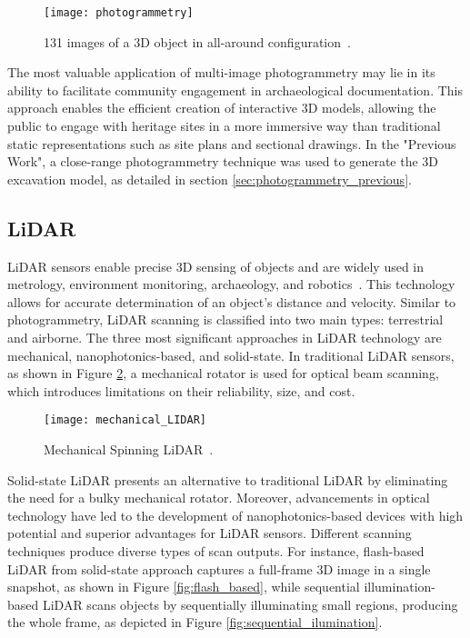 \begin{figure}[h!]
    \centering
    \texttt{[image: photogrammetry]}
    \caption{131 images of a \gls{3D} object in all-around configuration~\cite{luhmann2016sensor}.}
    \label{fig:photo2}
\end{figure} 
\FloatBarrier

  
The most valuable application of multi-image photogrammetry
may lie in its ability to facilitate community engagement in archaeological documentation.
This approach enables the efficient creation of interactive \gls{3D} models, allowing the public to engage with heritage sites
in a more immersive way than traditional static representations such as site plans and sectional drawings. In the "Previous Work", a close-range photogrammetry technique was used to generate the \gls{3D} excavation model, as detailed in section \ref{sec:photogrammetry_previous}.

\subsection{LiDAR}
\label{sec:lidar}

\gls{LiDAR} sensors enable precise \gls{3D} sensing of objects and are widely used in metrology, environment monitoring, archaeology, and robotics~\cite{li2022progress}.
This technology allows for accurate determination of an object’s distance and velocity. 
Similar to photogrammetry, \gls{LiDAR} scanning is classified into two main types: terrestrial and airborne.
The three most significant approaches in \gls{LiDAR} technology are mechanical, nanophotonics-based, and solid-state.
In traditional \gls{LiDAR} sensors, as shown in Figure \ref{fig:mechanical_LIDAR}, a mechanical rotator is used for optical beam scanning, which introduces limitations on their reliability, size, and cost.

 
\begin{figure}[h!]
    \centering
    \texttt{[image: mechanical\_LIDAR]}
    \caption{Mechanical Spinning \gls{LiDAR}~\cite{inbook}.}
    \label{fig:mechanical_LIDAR}
\end{figure} 
\FloatBarrier


Solid-state \gls{LiDAR} presents an alternative to traditional \gls{LiDAR} by eliminating the need for a bulky mechanical rotator. %
Moreover, advancements in optical technology have led to the development of nanophotonics-based devices with high potential and superior advantages for \gls{LiDAR} sensors. %
Different scanning techniques produce diverse types of scan outputs. For instance, flash-based LiDAR from solid-state approach captures a full-frame \gls{3D} image in a single snapshot, as shown in Figure \ref{fig:flash_based}, while sequential illumination-based LiDAR scans objects by sequentially illuminating small regions, producing the whole frame, as depicted in Figure \ref{fig:sequential_ilumination}. \\

